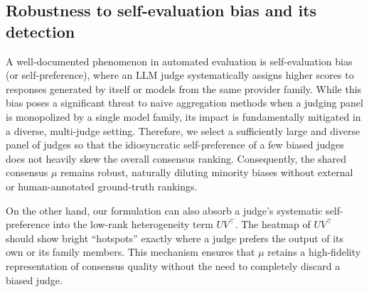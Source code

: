 \documentclass{article}
\begin{document}
\begin{bibunit}[unsrtnat]



\subsection{Robustness to self-evaluation bias and its detection}
\label{subsec:self_evaluation_bias}

A well-documented phenomenon in automated evaluation is self-evaluation bias (or self-preference), where an LLM judge systematically assigns higher scores to responses generated by itself or models from the same provider family. While this bias poses a significant threat to naive aggregation methods when a judging panel is monopolized by a single model family, its impact is fundamentally mitigated in a diverse, multi-judge setting.
Therefore, we select a sufficiently large and diverse panel of judges so that the idiosyncratic self-preference of a few biased judges does not heavily skew the overall consensus ranking. Consequently, the shared consensus $\mu$ remains robust, naturally diluting minority biases without external or human-annotated ground-truth rankings.

On the other hand, our formulation can also absorb a judge's systematic self-preference into the low-rank heterogeneity term $UV^\top$. The heatmap of $UV^\top$ should show bright ``hotspots'' exactly where a judge prefers the output of its own or its family members. This mechanism ensures that $\mu$ retains a high-fidelity representation of consensus quality without the need to completely discard a biased judge.

\end{bibunit}
\end{document}
